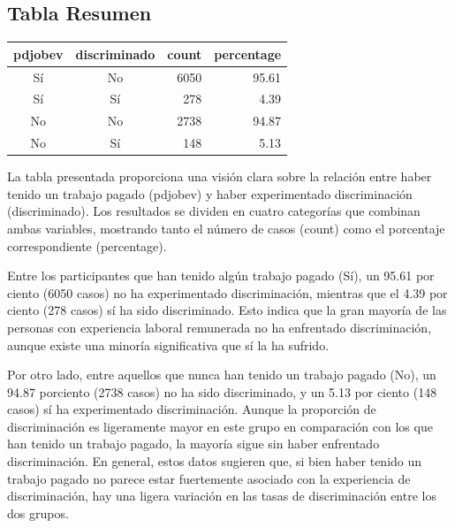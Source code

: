 \documentclass{article}
\begin{document}
\subsection{Tabla Resumen}
\begin{table}[ht]
\centering
\begin{tabular}{ccrr}
  \hline
pdjobev & discriminado & count & percentage \\ 
  \hline
Sí & No & 6050 & 95.61 \\ 
  Sí & Sí & 278 & 4.39 \\ 
  No & No & 2738 & 94.87 \\ 
  No & Sí & 148 & 5.13 \\ 
   \hline
\end{tabular}
\end{table}La tabla presentada proporciona una visión clara sobre la relación entre haber tenido un trabajo pagado (pdjobev) y haber experimentado discriminación (discriminado). Los resultados se dividen en cuatro categorías que combinan ambas variables, mostrando tanto el número de casos (count) como el porcentaje correspondiente (percentage).

Entre los participantes que han tenido algún trabajo pagado (Sí), un 95.61 por ciento (6050 casos) no ha experimentado discriminación, mientras que el 4.39 por ciento (278 casos) sí ha sido discriminado. Esto indica que la gran mayoría de las personas con experiencia laboral remunerada no ha enfrentado discriminación, aunque existe una minoría significativa que sí la ha sufrido.

Por otro lado, entre aquellos que nunca han tenido un trabajo pagado (No), un 94.87 porciento (2738 casos) no ha sido discriminado, y un 5.13 por ciento (148 casos) sí ha experimentado discriminación. Aunque la proporción de discriminación es ligeramente mayor en este grupo en comparación con los que han tenido un trabajo pagado, la mayoría sigue sin haber enfrentado discriminación. En general, estos datos sugieren que, si bien haber tenido un trabajo pagado no parece estar fuertemente asociado con la experiencia de discriminación, hay una ligera variación en las tasas de discriminación entre los dos grupos.
\end{document}
